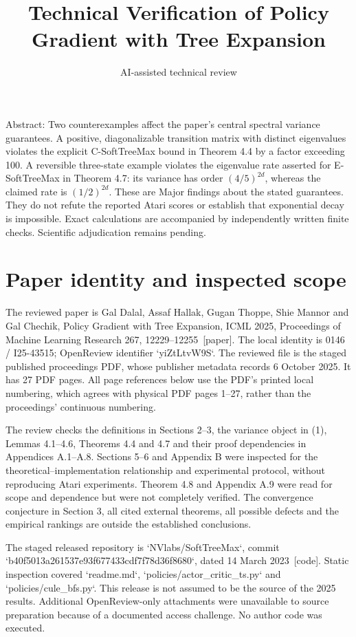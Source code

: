 \documentclass[10pt]{article}
\title{Technical Verification of
Policy Gradient with Tree Expansion}
\author{AI-assisted technical review}
\date{}
\begin{document}
\maketitle
Abstract: Two counterexamples affect the paper’s central spectral variance guarantees. A positive, diagonalizable transition matrix with distinct eigenvalues violates the explicit C-SoftTreeMax bound in Theorem 4.4 by a factor exceeding 100. A reversible three-state example violates the eigenvalue rate asserted for E-SoftTreeMax in Theorem 4.7: its variance has order \((4/5)^{2d}\), whereas the claimed rate is \((1/2)^{2d}\). These are Major findings about the stated guarantees. They do not refute the reported Atari scores or establish that exponential decay is impossible. Exact calculations are accompanied by independently written finite checks. Scientific adjudication remains pending.\par
\section*{Paper identity and inspected scope}
The reviewed paper is Gal Dalal, Assaf Hallak, Gugan Thoppe, Shie Mannor and Gal Chechik, Policy Gradient with Tree Expansion, ICML 2025, Proceedings of Machine Learning Research 267, 12229–12255 [paper]. The local identity is 0146 / I25-43515; OpenReview identifier `yiZtLtvW9S`. The reviewed file is the staged published proceedings PDF, whose publisher metadata records 6 October 2025. It has 27 PDF pages. All page references below use the PDF’s printed local numbering, which agrees with physical PDF pages 1–27, rather than the proceedings’ continuous numbering.\par
The review checks the definitions in Sections 2–3, the variance object in (1), Lemmas 4.1–4.6, Theorems 4.4 and 4.7 and their proof dependencies in Appendices A.1–A.8. Sections 5–6 and Appendix B were inspected for the theoretical–implementation relationship and experimental protocol, without reproducing Atari experiments. Theorem 4.8 and Appendix A.9 were read for scope and dependence but were not completely verified. The convergence conjecture in Section 3, all cited external theorems, all possible defects and the empirical rankings are outside the established conclusions.\par
The staged released repository is `NVlabs/SoftTreeMax`, commit `b40f5013a261537e93f677433cdf7f78d36f8680`, dated 14 March 2023 [code]. Static inspection covered `readme.md`, `policies/actor\_critic\_ts.py` and `policies/cule\_bfs.py`. This release is not assumed to be the source of the 2025 results. Additional OpenReview-only attachments were unavailable to source preparation because of a documented access challenge. No author code was executed.\par
\end{document}

